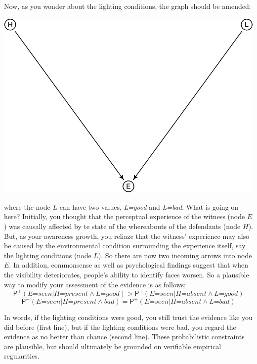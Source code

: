 \documentclass[
  11pt,
  dvipsnames,enabledeprecatedfontcommands]{scrartcl}
\newcommand{\ppr}[2]{\ensuremath{\mathsf{P}^{#1}(#2)}}
\begin{document}
Now, as you wonder about the lighting conditions, the graph should be
amended:

\begin{center}\includegraphics[width=0.5\linewidth,height=0.3\textheight]{ReplyToSteeleStefansson5_files/figure-latex/lighting2DAG-1} \end{center}

\noindent where the node \(L\) can have two values, \textit{L=good} and
\textit{L=bad}. What is going on here? Initially, you thought that the
perceptual experience of the witness (node \(E\)) was causally affected
by te state of the whereabouts of the defendants (node \(H\)). But, as
your awareness growth, you reliaze that the witness' experience may also
be caused by the environmental condition surrounding the experience
itself, say the lighting conditions (node \(L\)). So there are now two
incoming arrows into node \(E\). In addition, commonsense as well as
psychological findings suggest that when the visibility deteriorates,
people's ability to identify faces worsen. So a plausible way to modify
your assessment of the evidence is as follows:
\[\ppr{+}{\textit{E=seen} \vert \textit{H=present} \wedge \textit{L=good}} > \ppr{+}{\textit{E=seen} \vert \textit{H=absent} \wedge \textit{L=good}}\]
\[\ppr{+}{\textit{E=seen} \vert \textit{H=present} \wedge \textit{bad}} = \ppr{+}{\textit{E=seen} \vert \textit{H=absent} \wedge \textit{L=bad}}\]

\noindent In words, if the lighting conditions were good, you still
trust the evidence like you did before (first line), but if the lighting
conditions were bad, you regard the evidence as no better than chance
(second line). These probabilistic constraints are plausible, but should
ultimately be grounded on verifiable empirical regularities.
\end{document}
